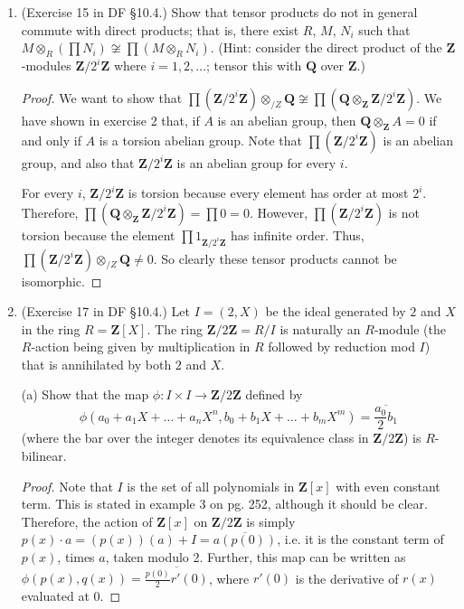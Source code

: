 \documentclass[10pt]{article}
\newcommand{\Q}{\mathbf{Q}}
\newcommand{\Z}{\mathbf{Z}}
\renewcommand{\bar}{\overline}
\begin{document}
\begin{enumerate}
\item (Exercise 15 in DF \S 10.4.) Show that tensor products do not in general commute with direct products; that is, there exist $R$, $M$, $N_i$ such that $M \otimes_R \left( \prod N_i \right) \not \cong \prod (M \otimes_R N_i)$.  (Hint: consider the direct product of the $\mathbf{Z}$-modules $\mathbf{Z}/2^i \mathbf{Z}$ where $i = 1, 2, \ldots$; tensor this with $\mathbf{Q}$ over $\mathbf{Z}$.)

\begin{proof}
We want to show that $\prod (\Z / 2^i \Z) \otimes_{/Z} \Q \not \cong \prod (\Q \otimes_{\Z} \Z / 2^i \Z)$.  We have shown in exercise 2 that, if $A$ is an abelian group, then $\Q \otimes_{\Z} A = 0$ if and only if $A$ is a torsion abelian group.  Note that $\prod (\Z / 2^i \Z)$ is an abelian group, and also that $\Z / 2^i \Z$ is an abelian group for every $i$.

For every $i$, $\Z / 2^i \Z$ is torsion because every element has order at most $2^i$.  Therefore, $\prod (\Q \otimes_{\Z} \Z / 2^i \Z) = \prod 0 = 0$.  However, $\prod (\Z / 2^i \Z)$ is not torsion because the element $\prod 1_{\Z / 2^i \Z}$ has infinite order.  Thus, $\prod (\Z / 2^i \Z) \otimes_{/Z} \Q \neq 0$.  So clearly these tensor products cannot be isomorphic.
\end{proof}

\item (Exercise 17 in DF \S 10.4.) Let $I = (2,X)$ be the ideal generated by $2$ and $X$ in the ring $R = \mathbf{Z}[X]$.  The ring $\mathbf{Z}/2\mathbf{Z} = R/I$ is naturally an $R$-module (the $R$-action being given by multiplication in $R$ followed by reduction mod $I$) that is annihilated by both $2$ and $X$.

(a) Show that the map $\phi: I \times I \rightarrow \mathbf{Z}/2\mathbf{Z}$ defined by
\[
\phi(a_0+a_1X+\ldots+a_nX^n,b_0+b_1X+\ldots+b_mX^m) = \overline{\frac{a_0}{2} b_1}
\]
(where the bar over the integer denotes its equivalence class in $\mathbf{Z}/2\mathbf{Z}$) is $R$-bilinear.

\begin{proof}
Note that $I$ is the set of all polynomials in $\Z[x]$ with even constant term.  This is stated in example 3 on pg. 252, although it should be clear.  Therefore, the action of $\Z[x]$ on $\Z/2\Z$ is simply $p(x) \cdot a = (p(x))(a) + I = \bar{a(p(0))}$, i.e. it is the constant term of $p(x)$, times $a$, taken modulo 2.  Further, this map can be written as $\phi(p(x),q(x)) = \bar{\frac{p(0)}{2}r'(0)}$, where $r'(0)$ is the derivative of $r(x)$ evaluated at $0$. %


\end{proof}
\end{enumerate}
\end{document}
